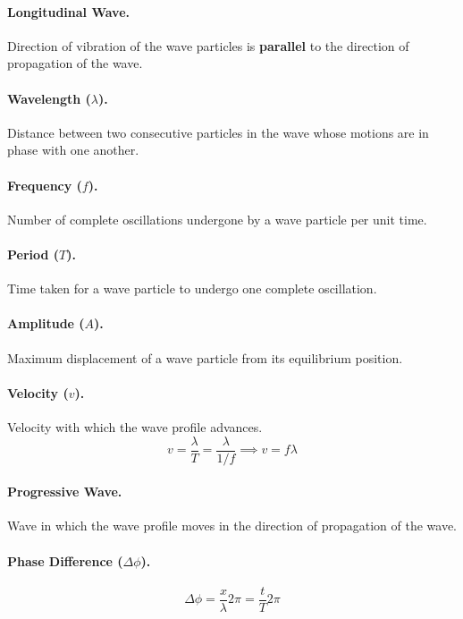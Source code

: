 \documentclass{article}
\begin{document}
\paragraph{Longitudinal Wave.} Direction of vibration of the wave particles is \textbf{parallel} to the direction of propagation of the wave.

\paragraph{Wavelength ($\lambda$).} Distance between two consecutive particles in the wave whose motions are in phase with one another.

\paragraph{Frequency ($f$).} Number of complete oscillations undergone by a wave particle per unit time.

\paragraph{Period ($T$).} Time taken for a wave particle to undergo one complete oscillation.

\paragraph{Amplitude ($A$).} Maximum displacement of a wave particle from its equilibrium position.

\paragraph{Velocity ($v$).} Velocity with which the wave profile advances. \begin{equation}
v = \frac{\lambda}{T} = \frac{\lambda}{1/f} \implies v = f\lambda
\end{equation}

\paragraph{Progressive Wave.} Wave in which the wave profile moves in the direction of propagation of the wave.

\paragraph{Phase Difference ($\Delta\phi$).} \begin{equation}
\Delta\phi = \frac{x}{\lambda} 2\pi = \frac{t}{T} 2\pi
\end{equation}
\end{document}
